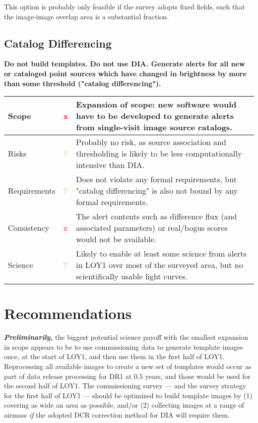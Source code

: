 \documentclass[DM,lsstdraft,toc]{lsstdoc}
\begin{document}
This option is probably only feasible if the survey adopts fixed fields, such that the image-image overlap area is a substantial fraction.


\subsection{Catalog Differencing}

{\bf Do not build templates. Do not use DIA. Generate alerts for all new or cataloged point sources which have changed in brightness by more than some threshold ("catalog differencing").}

\begin{center}
\begin{tabular}{|p{2.5cm}|p{0.3cm}|p{13cm}|}
\hline
Scope & \textcolor{red}{x} & Expansion of scope: new software would have to be developed to generate alerts from single-visit image source catalogs. \\
\hline
Risks & \textcolor{orange}{?} & Probably no risk, as source association and thresholding is likely to be less computationally intensive than DIA. \\
\hline
Requirements & \textcolor{orange}{?} & Does not violate any formal requirements, but "catalog differencing" is also not bound by any formal requirements. \\
\hline
Consistency & \textcolor{red}{x} & The alert contents such as difference flux (and associated parameters) or real/bogus scores would not be available. \\
\hline
Science & \textcolor{orange}{?} & Likely to enable at least some science from alerts in LOY1 over most of the surveyed area, but no scientifically usable light curves. \\
\hline
\end{tabular}
\end{center}



\section{Recommendations}\label{sec:rec}

{\bf {\em Preliminarily,}} the biggest potential science payoff with the smallest expansion in scope appears to be to use commissioning data to generate template images once, at the start of LOY1, and then use them in the first half of LOY1. Reprocessing all available images to create a new set of templates would occur as part of data release processing for DR1 at $0.5$ years, and those would be used for the second half of LOY1. The commissioning survey --- and the survey strategy for the first half of LOY1 --- should be optimized to build template images by (1) covering as wide an area as possible, and/or (2) collecting images at a range of airmass {\em if} the adopted DCR correction method for DIA will require them.







\end{document}
